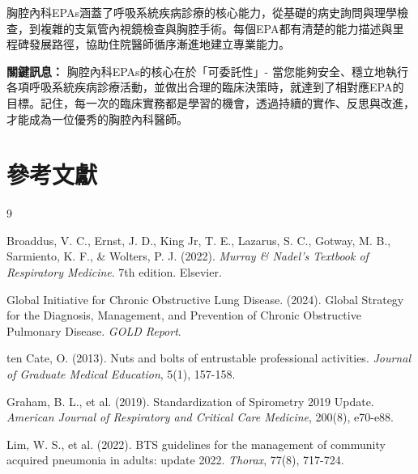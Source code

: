\documentclass[12pt,a4paper]{article}
\begin{document}
胸腔內科EPAs涵蓋了呼吸系統疾病診療的核心能力，從基礎的病史詢問與理學檢查，到複雜的支氣管內視鏡檢查與胸腔手術。每個EPA都有清楚的能力描述與里程碑發展路徑，協助住院醫師循序漸進地建立專業能力。

\begin{importantbox}
\textbf{關鍵訊息：} 胸腔內科EPAs的核心在於「可委託性」- 當您能夠安全、穩立地執行各項呼吸系統疾病診療活動，並做出合理的臨床決策時，就達到了相對應EPA的目標。記住，每一次的臨床實務都是學習的機會，透過持續的實作、反思與改進，才能成為一位優秀的胸腔內科醫師。
\end{importantbox}

\section{參考文獻}
\begin{thebibliography}{9}

Broaddus, V. C., Ernst, J. D., King Jr, T. E., Lazarus, S. C., Gotway, M. B., Sarmiento, K. F., \& Wolters, P. J. (2022). \textit{Murray \& Nadel's Textbook of Respiratory Medicine}. 7th edition. Elsevier.

Global Initiative for Chronic Obstructive Lung Disease. (2024). Global Strategy for the Diagnosis, Management, and Prevention of Chronic Obstructive Pulmonary Disease. \textit{GOLD Report}.

ten Cate, O. (2013). Nuts and bolts of entrustable professional activities. \textit{Journal of Graduate Medical Education}, 5(1), 157-158.

Graham, B. L., et al. (2019). Standardization of Spirometry 2019 Update. \textit{American Journal of Respiratory and Critical Care Medicine}, 200(8), e70-e88.

Lim, W. S., et al. (2022). BTS guidelines for the management of community acquired pneumonia in adults: update 2022. \textit{Thorax}, 77(8), 717-724.

\end{thebibliography}
\end{document}
